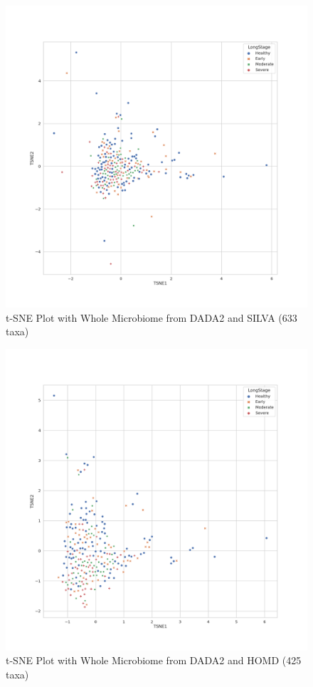 \documentclass[a4paper]{article}
\begin{document}
            \begin{figure}[p]
                \centering
                \includegraphics[width=0.6 \linewidth]{figures/tSNE/Whole/whole.DADA2.silva.png}
                \caption{t-SNE Plot with Whole Microbiome from DADA2 and SILVA (633 taxa)}
                \label{fig:tsne-whole-dada2-silva}
            \end{figure}

            \begin{figure}[p]
                \centering
                \includegraphics[width=0.6 \linewidth]{figures/tSNE/Whole/whole.DADA2.homd.png}
                \caption{t-SNE Plot with Whole Microbiome from DADA2 and HOMD (425 taxa)}
                \label{fig:tsne-whole-dada2-homd}
            \end{figure}
\end{document}
